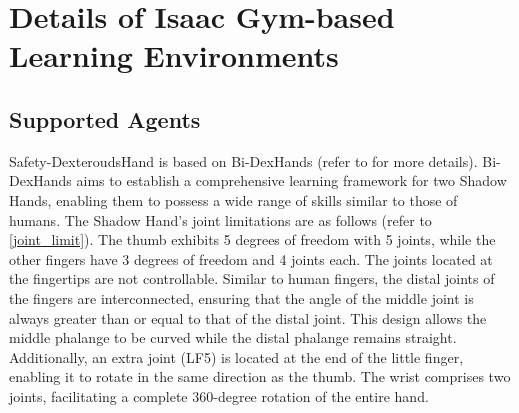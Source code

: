 \documentclass{article}
\begin{document}
\section{Details of Isaac Gym-based Learning Environments}
\subsection{Supported Agents}
Safety-DexteroudsHand is based on Bi-DexHands (refer to \cite{chen2022towards} for more details). Bi-DexHands aims to establish a comprehensive learning framework for two Shadow Hands, enabling them to possess a wide range of skills similar to those of humans. The Shadow Hand's joint limitations are as follows (refer to \autoref{joint_limit}). The thumb exhibits 5 degrees of freedom with 5 joints, while the other fingers have 3 degrees of freedom and 4 joints each. The joints located at the fingertips are not controllable. Similar to human fingers, the distal joints of the fingers are interconnected, ensuring that the angle of the middle joint is always greater than or equal to that of the distal joint. This design allows the middle phalange to be curved while the distal phalange remains straight. Additionally, an extra joint (LF5) is located at the end of the little finger, enabling it to rotate in the same direction as the thumb. The wrist comprises two joints, facilitating a complete 360-degree rotation of the entire hand.

\begin{table}[htbp]
    \centering
    \caption{Finger range of motion.}
    \label{joint_limit}
\end{table}
\end{document}
